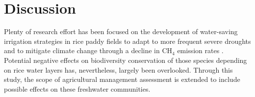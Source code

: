 \section{Discussion}
\label{sec:discussion}

Plenty of research effort has been focused on the development of water-saving irrigation strategies in rice paddy fields to adapt to more frequent severe droughts \citep{bouman2007, luo2019, shankar2021} and to mitigate climate change through a decline in CH$_{4}$ emission rates \citep{linquist2018}. Potential negative effects on biodiversity conservation of those species depending on rice water layers has, nevertheless, largely been overlooked. Through this study, the scope of agricultural management assessment is extended to include possible effects on these freshwater communities. \\

